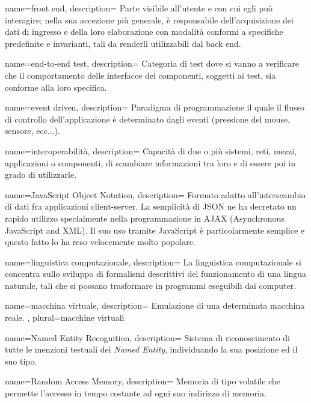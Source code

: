  {
name=front end,
description={
Parte visibile all’utente e con cui egli può interagire; nella sua accezione più
generale, è responsabile dell’acquisizione dei dati di ingresso e della loro
elaborazione con modalità conformi a specifiche predefinite e invarianti, tali
da renderli utilizzabili dal back end.
}
}

 {
name=end-to-end test,
description={
Categoria di test dove si vanno a verificare che il comportamento delle
interfacce dei componenti, soggetti ai test, sia conforme alla loro specifica.
}
}

 {
name=event driven,
description={
Paradigma di programmazione il quale il flusso di controllo dell'applicazione è
determinato dagli eventi (pressione del mouse, sensore, ecc...).
}
}

 {
name=interoperabilità,
description={
Capacità di due o più sistemi, reti, mezzi, applicazioni o componenti, di
scambiare informazioni tra loro e di essere poi in grado di utilizzarle.
}
}

 {
name=JavaScript Object Notation,
description={
Formato adatto all’interscambio di dati fra applicazioni client-server. La
semplicità di JSON ne ha decretato un rapido utilizzo specialmente nella
programmazione in AJAX (Asynchronous JavaScript and XML). Il suo uso tramite
JavaScript è particolarmente semplice e questo fatto lo ha reso velocemente
molto popolare.
}
}

 {
name=linguistica computazionale,
description={
La linguistica computazionale si concentra sullo sviluppo di formalismi
descrittivi del funzionamento di una lingua naturale, tali che si possano
trasformare in programmi eseguibili dai computer.
}
}

 {
name=macchina virtuale,
description={
Emulazione di una determinata macchina reale.
},
plural=macchine virtuali
}

 {
name=Named Entity Recognition,
description={
Sistema di riconoscimento di tutte le menzioni testuali dei
\textit{Named Entity}, individuando la sua posizione ed il suo tipo.
}
}

 {
name=Random Access Memory,
description={
Memoria di tipo volatile che permette l'accesso in tempo costante ad ogni suo
indirizzo di memoria.
}
}

